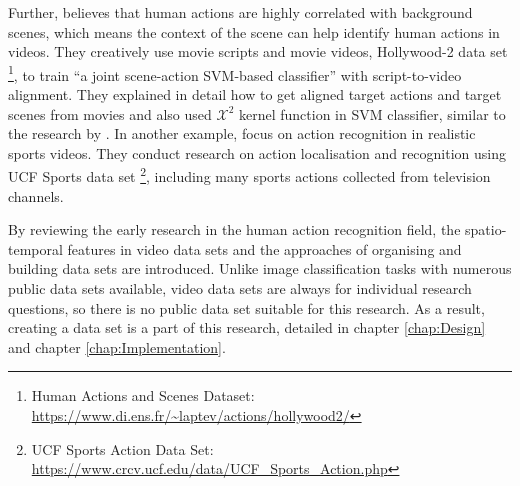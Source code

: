 Further, \citet{marszalek2009actions} believes that human actions are highly correlated with background scenes, which means the context of the scene can help identify human actions in videos.
They creatively use movie scripts and movie videos, Hollywood-2 data set \footnote{Human Actions and Scenes Dataset: \url{https://www.di.ens.fr/~laptev/actions/hollywood2/}}, to train ``a joint scene-action SVM-based classifier'' with script-to-video alignment.
They explained in detail how to get aligned target actions and target scenes from movies and also used $\mathcal{X}^2$ kernel function in SVM classifier, similar to the research by \citet{schuldt2004recognizing}. In another example, \citet{Soomro2014} focus on action recognition in realistic sports videos.
They conduct research on action localisation and recognition using UCF Sports data set \footnote{UCF Sports Action Data Set: \url{https://www.crcv.ucf.edu/data/UCF_Sports_Action.php}}, including many sports actions collected from television channels.

By reviewing the early research in the human action recognition field, the spatio-temporal features in video data sets and the approaches of organising and building data sets are introduced.
Unlike image classification tasks with numerous public data sets available, video data sets are always for individual research questions, so there is no public data set suitable for this research.
As a result, creating a data set is a part of this research, detailed in chapter \ref{chap:Design} and chapter \ref{chap:Implementation}.